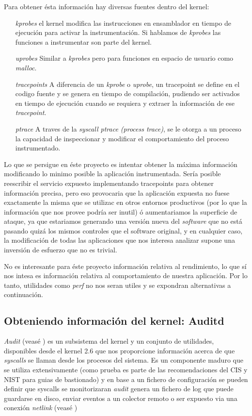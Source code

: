 Para obtener ésta información hay diversas fuentes dentro del kernel:

\begin{enumerate}
    \item[\emph{kprobes}] el kernel modifica las instrucciones en ensamblador en tiempo de ejecución para activar la instrumentación. Si hablamos
    de \emph{kprobes} las funciones a instrumentar son parte del kernel. 
    \item[\emph{uprobes}] Similar a \emph{kprobes} pero para funciones en espacio de usuario como \emph{malloc}.
    \item[\emph{tracepoints}] A diferencia de un \emph{kprobe} o \emph{uprobe}, un tracepoint se define en el codigo fuente y se genera en tiempo de compilación, pudiendo ser activados en tiempo de ejecución cuando se requiera y extraer la información de ese \emph{tracepoint}.
    \item[\emph{ptrace}] A traves de la \emph{syscall ptrace (process trace)}, se le otorga a un proceso la capacidad de inspeccionar y modificar el comportamiento del proceso instrumentado. 
\end{enumerate}

Lo que se persigue en éste proyecto es intentar obtener la máxima información modificando lo minimo posible la aplicación instrumentada. Sería posible
reescribir el servicio expuesto implementando tracepoints para obtener información precisa, pero eso provocaria que la aplicación expuesta no fuese exactamente la misma que se utilizac
en otros entornos productivos (por lo que la información que nos provee podría ser inutil) ó aumentariamos la superficie de ataque, ya que estariamos
generando una versión nueva del \emph{software} que no está pasando quizá los mismos controles que el software original, y en cualquier caso, la modificación de todas las aplicaciones
que nos interesa analizar supone una inversión de esfuerzo que no es trivial.

No es interesante para éste proyecto información relativa al rendimiento, lo que sí nos intesa es información relativa al comportamiento de nuestra aplicación. Por lo tanto,
utilidades como \emph{perf} no nos seran utiles y se expondran alternativas a continuación.

\subsection{Obteniendo información del kernel: Auditd}

\emph{Audit} (veasé \cite{redhat-auditd}) es un subsistema del kernel y un conjunto de utilidades, 
disponibles desde el kernel 2.6 que nos proporcione información acerca de que \emph{syscalls}
se llaman desde los procesos del sistema. 
Es un componente maduro que se utiliza extensivamente (como prueba es parte de las recomendaciones del CIS y NIST para guias de bastionado)
y en base a un fichero de configuración se pueden definir que syscalls se monitorizaran
\emph{audit} genera un fichero de log que puede guardarse en disco, enviar eventos a un colector remoto o ser expuesto via una conexión
\emph{netlink} (veasé \cite{wiki-netlink})

